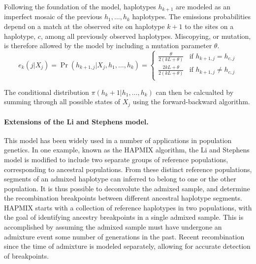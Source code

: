 Following the foundation of the model, haplotypes $h_{k+1}$ are modeled as an imperfect mosaic of the previous $h_1,\dots,h_k$ haplotypes.
The emissions probabilities depend on a match at the observed site on haplotype $k+1$ to the sites on a haplotype, $c$, among all previously observed haplotypes.
Miscopying, or mutation, is therefore allowed by the model by including a mutation parameter $\theta$.
\begin{equation}
    e_k(j|X_j) = 
    \Pr( h_{k+1,j} | X_j , h_1,\dots,h_k ) = 
    \begin{cases}
        \frac{ \theta }{ 2(kL+\theta) }
        & \text{if $h_{k+1,j} = h_{c,j}$} \\
        \frac{ 2kL+\theta }{ 2(kL+\theta) }
        & \text{if $h_{k+1,j} \ne h_{c,j}$} \\
    \end{cases}
\end{equation}

The conditional distribution $ \pi(h_k+1|h_1,\dots,h_k) $ can then be calcualted by summing through all possible states of $X_j$ using the forward-backward algorithm.

\paragraph{Extensions of the Li and Stephens model.}
This model has been widely used in a number of applications in population genetics.
In one example, known as the HAPMIX algorithm\cite{Price2009}, the Li and Stephens model is modified to include two separate groups of reference populations, corresponding to ancestral populations.
From these distinct reference populations, segments of an admixed haplotype can inferred to belong to one or the other population.
It is thus possible to deconvolute the admixed sample, and determine the recombination breakpoints between different ancestral haplotype segments.
HAPMIX starts with a collection of reference haplotypes in two populations, with the goal of identifying ancestry breakpoints in a single admixed sample.
This is accomplished by assuming the admixed sample must have undergone an admixture event some number of generations in the past.
Recent recombination since the time of admixture is modeled separately, allowing for accurate detection of breakpoints.

